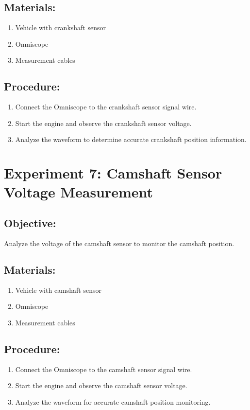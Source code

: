 \documentclass{scrreprt}
\begin{document}
\subsection*{Materials:}
\begin{enumerate}
    \item Vehicle with crankshaft sensor
    \item Omniscope
    \item Measurement cables
\end{enumerate}
\subsection*{Procedure:}
\begin{enumerate}
    \item Connect the Omniscope to the crankshaft sensor signal wire.
    \item Start the engine and observe the crankshaft sensor voltage.
    \item Analyze the waveform to determine accurate crankshaft position information.
\end{enumerate}

\section*{Experiment 7: Camshaft Sensor Voltage Measurement}
\subsection*{Objective:} Analyze the voltage of the camshaft sensor to monitor the camshaft position.
\subsection*{Materials:}
\begin{enumerate}
    \item Vehicle with camshaft sensor
    \item Omniscope
    \item Measurement cables
\end{enumerate}
\subsection*{Procedure:}
\begin{enumerate}
    \item Connect the Omniscope to the camshaft sensor signal wire.
    \item Start the engine and observe the camshaft sensor voltage.
    \item Analyze the waveform for accurate camshaft position monitoring.
\end{enumerate}
\end{document}
